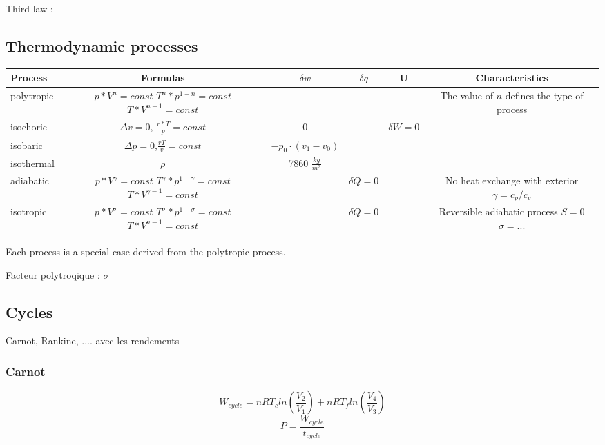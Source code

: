 	Third law : 
	\newpage
	\begin{landscape}

	\subsection{Thermodynamic processes}
	
	\begin{tabular}{|l|c|c|c|c|c|}
		\hline
		Process & Formulas & $\delta w$ & $\delta q$ & U & Characteristics \\ \hline
		polytropic & \makecell{$p*V^n=const$ \\ $T^n*p^{1-n}=const$ \\ $T*V^{n-1}=const$} & & & & The value of $n$ defines the type of process \\ \hline
		isochoric & $\Delta v=0$, $\frac{r*T}{p}=const$ & 0 & & $\delta W=0$ & \\ \hline
		isobaric & $\Delta p=0$,$\frac{rT}{v}=const$ & $-p_0 \cdot (v_1-v_0)$ & & & \\ \hline
		isothermal & $\rho$ & 7860 $\frac{kg}{m^3}$ & & &\\ \hline
		adiabatic & \makecell{$p*V^\gamma=const$ \\ $T^\gamma*p^{1-\gamma}=const$ \\ $T*V^{\gamma-1}=const$} & & $\delta Q=0$ & & \makecell{No heat exchange with exterior \\ $\gamma = c_p / c_v$} \\ \hline
		isotropic & \makecell{$p*V^\sigma=const$ \\ $T^\sigma*p^{1-\sigma}=const$ \\ $T*V^{\sigma-1}=const$}		 & & $\delta Q=0$ & & \makecell{Reversible adiabatic process \\ $S = 0$ \\ $\sigma = ...$} \\ \hline

	\end{tabular}
	
	Each process is a special case derived from the polytropic process. 
	\end{landscape}
	\newpage
	\medbreak
	Facteur polytroqique : $\sigma$
	
	
	\subsection{Cycles}
	Carnot, Rankine, .... avec les rendements
	\subsubsection{Carnot}
	\begin{equation}
	W_{cycle}= n R T_c ln(\frac{V_2}{V_1})+ nR T_f ln(\frac{V_4}{V_3})
	\end{equation}
	\begin{equation}
	P = \frac{W_{cycle}}{t_{cycle}}
	\end{equation}
	
